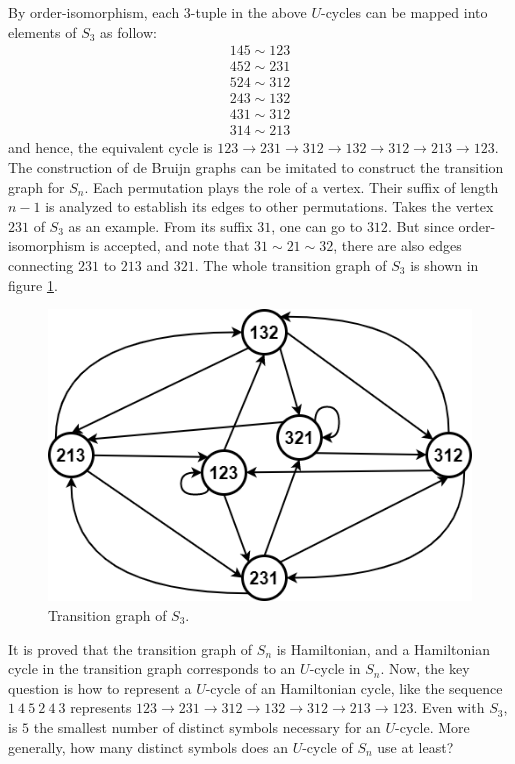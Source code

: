 By order-isomorphism, each $3$-tuple in the above $U$-cycles can be mapped into elements of $S_{3}$ as follow:
\begin{align*}
    145\sim123 \\
    452\sim231 \\
    524\sim312 \\
    243\sim132 \\
    431\sim312 \\
    314\sim213 
\end{align*}
and hence, the equivalent cycle is $123\rightarrow 231\rightarrow 312\rightarrow132\rightarrow312\rightarrow 213\rightarrow123 $. The construction of de Bruijn graphs can be imitated to construct the transition graph for $S_{n}$. Each permutation plays the role of a vertex. Their suffix of length $n-1$ is analyzed to establish its edges to other permutations. Takes the vertex $231$ of $S_{3}$ as an example. From its suffix $31$, one can go to $312$. But since order-isomorphism is accepted, and note that $31\sim21\sim32$, there are also edges connecting $231$ to $213$ and $321$. The whole transition graph of $S_{3}$ is shown in figure \ref{fig:S3_graph}.

\begin{figure}[htbp]
    \centering
    \includegraphics[scale=0.5]{fig/PermutationGraph.png}
    \caption{Transition graph of $S_{3}$.}
    \label{fig:S3_graph}
\end{figure}

It is proved that the transition graph of $S_{n}$ is Hamiltonian, and a Hamiltonian cycle in the transition graph corresponds to an $U$-cycle in $S_{n}$. Now, the key question is how to represent a $U$-cycle of an Hamiltonian cycle, like the sequence $1\ 4\ 5\ 2\ 4\ 3$ represents $123\rightarrow 231\rightarrow 312\rightarrow132\rightarrow312\rightarrow 213\rightarrow123 $. Even with $S_{3}$, is $5$ the smallest number of distinct symbols necessary for an $U$-cycle. More generally, how many distinct symbols does an $U$-cycle of $S_{n}$ use at least? 


